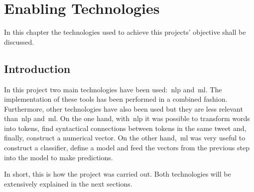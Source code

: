 \chapter{Enabling Technologies}
\label{chap:entech}


In this chapter the technologies used to achieve this projects' objective shall be discussed.

\section{Introduction}\par
In this project two main technologies have been used:~\ac{nlp}  and~\ac{ml}. The implementation of these tools has been performed in a combined fashion. Furthermore, other technologies have also been used but they are less relevant than~\ac{nlp} and~\ac{ml}.
On the one hand, with~\ac{nlp} it was possible to transform words into tokens, find syntactical connections between tokens in the same tweet and, finally, construct a numerical vector. On the other hand,~\ac{ml} was very useful to construct a classifier, define a model and feed the vectors from the previous step into the model to make predictions.\par
In short, this is how the project was carried out. Both technologies will be extensively explained in the next sections.


